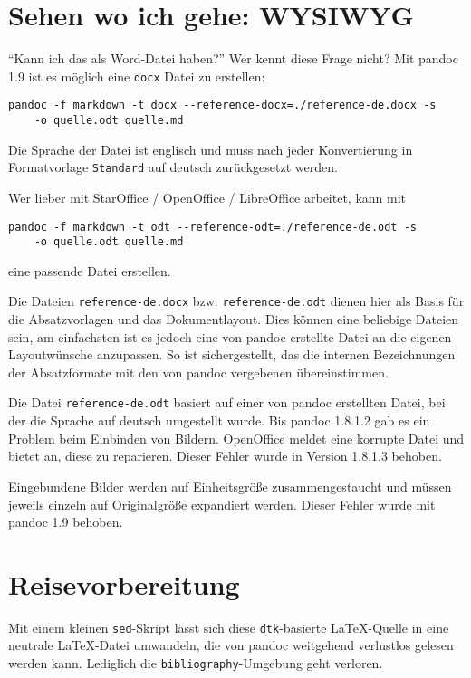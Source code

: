\documentclass[11pt,ngerman,a4paper]{article}
\begin{document}
\section{Sehen wo ich gehe: WYSIWYG}\label{sehen-wo-ich-gehe-wysiwyg}

\enquote{Kann ich das als Word-Datei haben?} Wer kennt diese Frage
nicht? Mit pandoc 1.9 ist es möglich eine \texttt{docx} Datei zu
erstellen:

\begin{verbatim}
pandoc -f markdown -t docx --reference-docx=./reference-de.docx -s 
    -o quelle.odt quelle.md
\end{verbatim}

Die Sprache der Datei ist englisch und muss nach jeder Konvertierung in
Formatvorlage \texttt{Standard} auf deutsch zurückgesetzt werden.

Wer lieber mit StarOffice / OpenOffice / LibreOffice arbeitet, kann mit

\begin{verbatim}
pandoc -f markdown -t odt --reference-odt=./reference-de.odt -s 
    -o quelle.odt quelle.md
\end{verbatim}

eine passende Datei erstellen.

Die Dateien \texttt{reference-de.docx} bzw. \texttt{reference-de.odt}
dienen hier als Basis für die Absatzvorlagen und das Dokumentlayout.
Dies können eine beliebige Dateien sein, am einfachsten ist es jedoch
eine von pandoc erstellte Datei an die eigenen Layoutwünsche anzupassen.
So ist sichergestellt, das die internen Bezeichnungen der Absatzformate
mit den von pandoc vergebenen übereinstimmen.

Die Datei \texttt{reference-de.odt} basiert auf einer von pandoc
erstellten Datei, bei der die Sprache auf deutsch umgestellt wurde. Bis
pandoc 1.8.1.2 gab es ein Problem beim Einbinden von Bildern. OpenOffice
meldet eine korrupte Datei und bietet an, diese zu reparieren. Dieser
Fehler wurde in Version 1.8.1.3 behoben.

Eingebundene Bilder werden auf Einheitsgröße zusammengestaucht und
müssen jeweils einzeln auf Originalgröße expandiert werden. Dieser
Fehler wurde mit pandoc 1.9 behoben.

\section{Reisevorbereitung}\label{reisevorbereitung}

Mit einem kleinen \texttt{sed}-Skript lässt sich diese
\texttt{dtk}-basierte LaTeX-Quelle in eine neutrale LaTeX-Datei
umwandeln, die von pandoc weitgehend verlustlos gelesen werden kann.
Lediglich die \texttt{bibliography}-Umgebung geht verloren.
\end{document}

